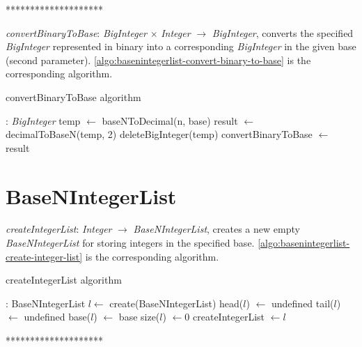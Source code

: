 \documentclass[book, nodocumentinfo]{upmethodology-document}
\newcommand{\separator}{\centerline{********************}}
\begin{document}
\separator

\emph{convertBinaryToBase}: \emph{BigInteger} \(×\) \emph{Integer} \(\rightarrow\) \emph{BigInteger},
converts the specified \emph{BigInteger} represented in binary into a corresponding \emph{BigInteger}
in the given base (second parameter).
\ref{algo:basenintegerlist-convert-binary-to-base} is the corresponding algorithm.

\begin{algorithm}[H]
    \caption{convertBinaryToBase algorithm}
    \label{algo:basenintegerlist-convert-binary-to-base}

    \begin{algorithmic}
         : \emph{BigInteger}
            \State temp \(\leftarrow\) baseNToDecimal(n, base)
            \State result \(\leftarrow\) decimalToBaseN(temp, 2)
            \State deleteBigInteger(temp)
            \State convertBinaryToBase \(\leftarrow\) result
        \EndFunction
    \end{algorithmic}
\end{algorithm}

\section{BaseNIntegerList}

\emph{createIntegerList}: \emph{Integer} \(\rightarrow\) \emph{BaseNIntegerList},
    creates a new empty \emph{BaseNIntegerList} for storing integers in the specified base.
    \ref{algo:basenintegerlist-create-integer-list} is the corresponding algorithm.

\begin{algorithm}[H]
    \caption{createIntegerList algorithm}
    \label{algo:basenintegerlist-create-integer-list}

    \begin{algorithmic}
         : BaseNIntegerList
            \State \(l \leftarrow\) create(BaseNIntegerList)
            \State head(\(l\)) \(\leftarrow\) undefined
            \State tail(\(l\)) \(\leftarrow\) undefined
            \State base(\(l\)) \(\leftarrow\) base
            \State size(\(l\)) \(\leftarrow 0\)
            \State createIntegerList \(\leftarrow l\)
        \EndFunction
    \end{algorithmic}
\end{algorithm}

\separator
\end{document}
